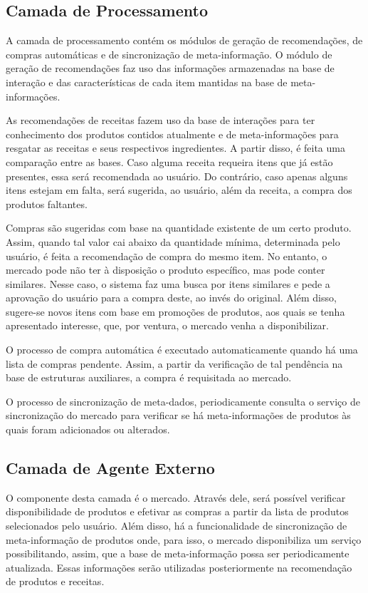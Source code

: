 \subsection{Camada de Processamento}

A camada de processamento contém os módulos de geração de recomendações, de compras automáticas e de sincronização de meta-informação. O módulo de geração de recomendações faz uso das informações armazenadas na base de interação e das características de cada item mantidas na base de meta-informações.

As recomendações de receitas fazem uso da base de interações para ter conhecimento dos produtos contidos atualmente e de meta-informações para resgatar as receitas e seus respectivos ingredientes. A partir disso, é feita uma comparação entre as bases. Caso alguma receita requeira itens que já estão presentes, essa será recomendada ao usuário. Do contrário, caso apenas alguns itens estejam em falta, será sugerida, ao usuário, além da receita, a compra dos produtos faltantes.

Compras são sugeridas com base na quantidade existente de um certo produto. Assim, quando tal valor cai abaixo da quantidade mínima, determinada pelo usuário, é feita a recomendação de compra do mesmo item. No entanto, o mercado pode não ter à disposição o produto específico, mas pode conter similares. Nesse caso, o sistema faz uma busca por itens similares e pede a aprovação do usuário para a compra deste, ao invés do original. Além disso, sugere-se novos itens com base em promoções de produtos, aos quais se tenha apresentado interesse, que, por ventura, o mercado venha a disponibilizar.

O processo de compra automática é executado automaticamente quando há uma lista de compras pendente. Assim, a partir da verificação de tal pendência na base de estruturas auxiliares, a compra é requisitada ao mercado. 

O processo de sincronização de meta-dados, periodicamente consulta o serviço de sincronização do mercado para verificar se há meta-informações de produtos às quais foram adicionados ou 
alterados.

\subsection{Camada de Agente Externo}

O componente desta camada é o mercado. Através dele, será possível verificar disponibilidade de produtos e efetivar as compras a partir da lista de produtos selecionados pelo usuário. Além disso, há a funcionalidade de sincronização de meta-informação de produtos onde, para isso, o mercado disponibiliza um serviço possibilitando, assim, que a base de meta-informação possa ser periodicamente atualizada. Essas informações serão utilizadas posteriormente na recomendação de produtos e receitas.


